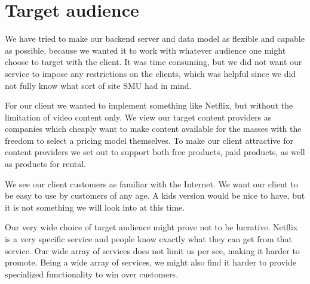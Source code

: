 \section{Target audience}
We have tried to make our backend server and data model as flexible and capable as possible, because we wanted it to work with whatever audience one might choose to target with the client. It was time consuming, but we did not want our service to impose any restrictions on the clients, which was helpful since we did not fully know what sort of site SMU had in mind.

For our client we wanted to implement something like Netflix, but without the limitation of video content only. 
We view our target content providers as companies which cheaply want to make content available for the masses with the freedom to select a pricing model themselves.
To make our client attractive for content providers we set out to support both free products, paid products, as well as products for rental.

We see our client customers as familiar with the Internet. We want our client to be easy to use by customers of any age. A kids version would be nice to have, but it is not something we will look into at this time.

Our very wide choice of target audience might prove not to be lucrative. Netflix is a very specific service and people know exactly what they can get from that service. Our wide array of services does not limit us per see, making it harder to promote. Being a wide array of services, we might also find it harder to provide specialized functionality to win over customers.
\newpage